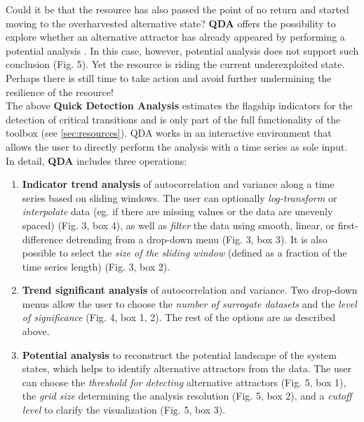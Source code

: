\documentclass[12pt,a4paper,final]{article}
\begin{document}
\begin{doublespacing}
Could it be that the resource has also passed the point of no return and started moving to the overharvested alternative state? \textbf{QDA} offers the possibility to explore whether an alternative attractor has already appeared by performing a potential analysis \cite{Kwasniok2009,Livina2010,Livina2011}. In this case, however, potential analysis does not support such conclusion (Fig. 5). Yet the resource is riding the current underexploited state. Perhaps there is still time to take action and avoid further undermining the resilience of the resource!\\


The above \textbf{Quick Detection Analysis} estimates the flagship indicators for the detection of critical transitions and is only part of the full functionality of the toolbox (see \ref{sec:resources}). QDA works in an interactive environment that allows the user to directly perform the analysis with a time series as sole input.
In detail, \textbf{QDA} includes three operations:
\begin{enumerate}
\item \textbf{Indicator trend analysis} of autocorrelation and variance along a time series based on sliding windows. The user can optionally \textit{log-transform} or \textit{interpolate} data (eg. if there are missing values or the data are unevenly spaced) (Fig. 3, box 4), as well as \textit{filter} the data using smooth, linear, or first-difference detrending from a drop-down menu (Fig. 3, box 3). It is also possible to select the \textit{size of the sliding window} (defined as a fraction of the time series length) (Fig. 3, box 2).
\item \textbf{Trend significant analysis} of autocorrelation and variance. Two drop-down menus allow the user to choose the \textit{number of surrogate datasets} and the \textit{level of significance} (Fig. 4, box 1, 2). The rest of the options are as described above.
\item \textbf{Potential analysis} to reconstruct the potential landscape of the system states, which helps to identify alternative attractors from the data. The user can choose the \textit{threshold for detecting} alternative attractors (Fig. 5, box 1), the \textit{grid size} determining the analysis resolution (Fig. 5, box 2), and a \textit{cutoff level} to clarify the visualization (Fig. 5, box 3).
\end{enumerate}


\end{doublespacing}
\end{document}
